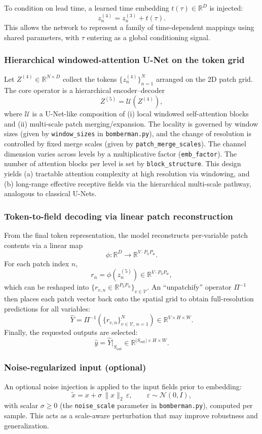 \documentclass{article} %
\begin{document}
To condition on lead time, a learned time embedding $t(\tau)\in\mathbb{R}^D$ is injected:
\[
z^{(4)}_n = z^{(3)}_n + t(\tau).
\]
This allows the network to represent a family of time-dependent mappings using shared parameters, with $\tau$ entering as a global conditioning signal.

\subsubsection{Hierarchical windowed-attention U-Net on the token grid}
\label{subsec:swin_unet_math}
Let $Z^{(4)}\in \mathbb{R}^{N\times D}$ collect the tokens $\{z^{(4)}_n\}_{n=1}^N$ arranged on the 2D patch grid. The core operator is a hierarchical encoder--decoder
\[
Z^{(5)} = \mathcal{U}(Z^{(4)}),
\]
where $\mathcal{U}$ is a U-Net-like composition of (i) local windowed self-attention blocks and (ii) multi-scale patch merging/expansion. The locality is governed by window sizes (given by \texttt{window\_sizes} in \texttt{bomberman.py}), and the change of resolution is controlled by fixed merge scales (given by \texttt{patch\_merge\_scales}). The channel dimension varies across levels by a multiplicative factor (\texttt{emb\_factor}). The number of attention blocks per level is set by \texttt{block\_structure}. This design yields (a) tractable attention complexity at high resolution via windowing, and (b) long-range effective receptive fields via the hierarchical multi-scale pathway, analogous to classical U-Nets.

\subsubsection{Token-to-field decoding via linear patch reconstruction}
\label{subsec:decode_math}
From the final token representation, the model reconstructs per-variable patch contents via a linear map
\[
\phi:\mathbb{R}^D \to \mathbb{R}^{V\cdot P_hP_w}.
\]
For each patch index $n$,
\[
r_n = \phi(z^{(5)}_n) \in \mathbb{R}^{V\cdot P_hP_w},
\]
which can be reshaped into $\{r_{v,n}\in\mathbb{R}^{P_hP_w}\}_{v\in\mathcal{V}}$. An ``unpatchify'' operator $\Pi^{-1}$ then places each patch vector back onto the spatial grid to obtain full-resolution predictions for all variables:
\[
\hat{Y} = \Pi^{-1}(\{r_{v,n}\}_{v\in\mathcal{V},\,n=1}^N) \in \mathbb{R}^{V\times H\times W}.
\]
Finally, the requested outputs are selected:
\[
\hat{y} = \hat{Y}\big|_{S_{\mathrm{out}}} \in \mathbb{R}^{|S_{\mathrm{out}}|\times H\times W}.
\]

\subsubsection{Noise-regularized input (optional)}
\label{subsec:noise_math}
An optional noise injection is applied to the input fields prior to embedding:
\[
\tilde{x} = x + \sigma \,\|x\|_2\,\varepsilon,\qquad \varepsilon\sim\mathcal{N}(0,I),
\]
with scalar $\sigma\ge 0$ (the \texttt{noise\_scale} parameter in \texttt{bomberman.py}), computed per sample. This acts as a scale-aware perturbation that may improve robustness and generalization.
\end{document}
